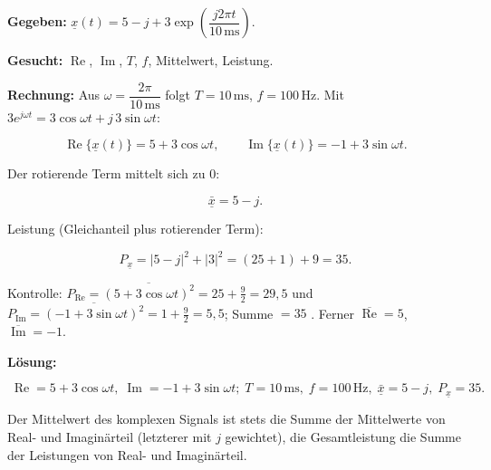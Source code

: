 \begin{beispiel}

\textbf{Gegeben:}
$\underline{x}(t) = 5 - j + 3\exp\!\left(\dfrac{j2\pi t}{10\,\mathrm{ms}}\right)$.

\textbf{Gesucht:} $\operatorname{Re}$, $\operatorname{Im}$, $T$, $f$,
Mittelwert, Leistung.

\textbf{Rechnung:} Aus $\omega = \dfrac{2\pi}{10\,\mathrm{ms}}$ folgt
$T = 10\,\mathrm{ms}$, $f = 100\,\mathrm{Hz}$. Mit
$3e^{j\omega t} = 3\cos\omega t + j\,3\sin\omega t$:

$$
\operatorname{Re}\{\underline{x}(t)\} = 5 + 3\cos\omega t,
\qquad
\operatorname{Im}\{\underline{x}(t)\} = -1 + 3\sin\omega t.
$$

Der rotierende Term mittelt sich zu $0$:

$$
\bar{\underline{x}} = 5 - j.
$$

Leistung (Gleichanteil plus rotierender Term):

$$
P_{\underline{x}} = |5 - j|^2 + |3|^2 = (25 + 1) + 9 = 35.
$$

Kontrolle: $P_{\operatorname{Re}} = \overline{(5 + 3\cos\omega t)^2}
= 25 + \tfrac{9}{2} = 29{,}5$ und
$P_{\operatorname{Im}} = \overline{(-1 + 3\sin\omega t)^2}
= 1 + \tfrac{9}{2} = 5{,}5$; Summe $= 35$ \checkmark. Ferner
$\overline{\operatorname{Re}} = 5$, $\overline{\operatorname{Im}} = -1$.

\textbf{Lösung:}

$$
\boxed{\;\operatorname{Re} = 5 + 3\cos\omega t,\;
\operatorname{Im} = -1 + 3\sin\omega t;\;
T = 10\,\mathrm{ms},\; f = 100\,\mathrm{Hz},\;
\bar{\underline{x}} = 5 - j,\; P_{\underline{x}} = 35.\;}
$$

Der Mittelwert des komplexen Signals ist stets die Summe der Mittelwerte von
Real- und Imaginärteil (letzterer mit $j$ gewichtet), die Gesamtleistung die
Summe der Leistungen von Real- und Imaginärteil.

\end{beispiel}
